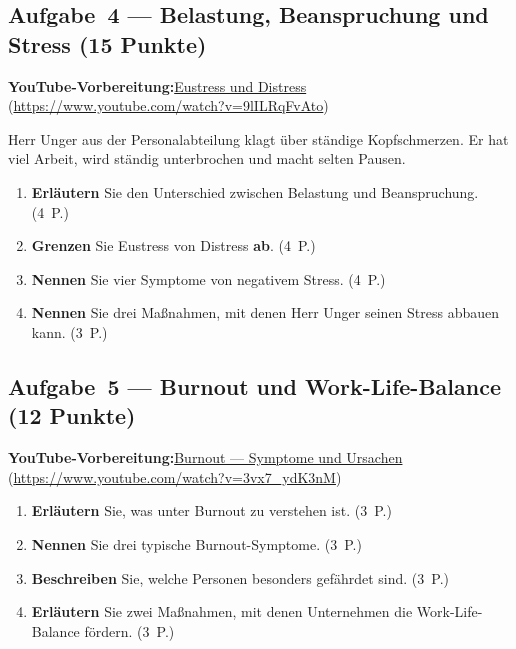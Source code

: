 \documentclass[11pt, a4paper]{article}
\begin{document}
\subsection*{Aufgabe~4 --- Belastung, Beanspruchung und Stress (15 Punkte)}

\noindent\textbf{\color{bfwAccent}YouTube-Vorbereitung:}\enspace \href{https://www.youtube.com/watch?v=9lILRqFvAto}{Eustress und Distress} (\url{https://www.youtube.com/watch?v=9lILRqFvAto})

\medskip
Herr Unger aus der Personalabteilung klagt über ständige Kopfschmerzen. Er hat viel Arbeit,
wird ständig unterbrochen und macht selten Pausen.

\begin{enumerate}[label=(\alph*)]
  \item \textbf{Erläutern} Sie den Unterschied zwischen Belastung und Beanspruchung. \hfill (4~P.)
  \item \textbf{Grenzen} Sie Eustress von Distress \textbf{ab}. \hfill (4~P.)
  \item \textbf{Nennen} Sie vier Symptome von negativem Stress. \hfill (4~P.)
  \item \textbf{Nennen} Sie drei Maßnahmen, mit denen Herr Unger seinen Stress abbauen kann. \hfill (3~P.)
\end{enumerate}

\subsection*{Aufgabe~5 --- Burnout und Work-Life-Balance (12 Punkte)}

\noindent\textbf{\color{bfwAccent}YouTube-Vorbereitung:}\enspace \href{https://www.youtube.com/watch?v=3vx7_ydK3nM}{Burnout --- Symptome und Ursachen} (\url{https://www.youtube.com/watch?v=3vx7_ydK3nM})

\medskip
\begin{enumerate}[label=(\alph*)]
  \item \textbf{Erläutern} Sie, was unter Burnout zu verstehen ist. \hfill (3~P.)
  \item \textbf{Nennen} Sie drei typische Burnout-Symptome. \hfill (3~P.)
  \item \textbf{Beschreiben} Sie, welche Personen besonders gefährdet sind. \hfill (3~P.)
  \item \textbf{Erläutern} Sie zwei Maßnahmen, mit denen Unternehmen die Work-Life-Balance fördern. \hfill (3~P.)
\end{enumerate}
\end{document}
